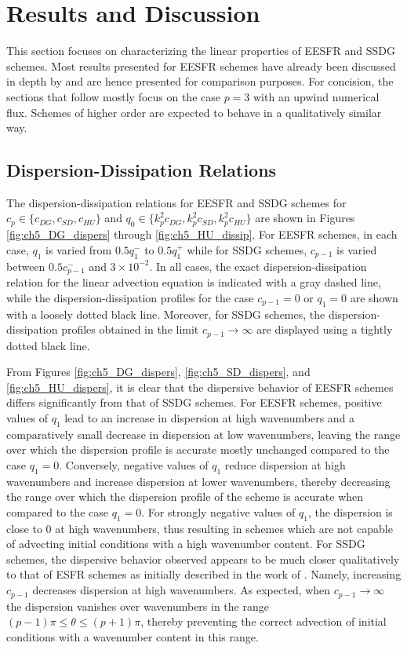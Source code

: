 \documentclass[preprint,12pt]{elsarticle}
\begin{document}
\section{Results and Discussion}
\label{sec:lin_prop}
This section focuses on characterizing the linear properties of EESFR and SSDG schemes. Most results presented for EESFR schemes have already been discussed in depth by \cite{vermeire2016properties} and are hence presented for comparison purposes. For concision, the sections that follow mostly focus on the case $p=3$ with an upwind numerical flux. Schemes of higher order are expected to behave in a qualitatively similar way.

\subsection{Dispersion-Dissipation Relations}
The dispersion-dissipation relations for EESFR and SSDG schemes for $c_p \in \{c_{DG}, c_{SD}, c_{HU}\}$ and $q_0 \in \{k_p^2c_{DG}, k_p^2c_{SD}, k_p^2c_{HU}\}$ are shown in Figures \ref{fig:ch5_DG_dispers} through \ref{fig:ch5_HU_dissip}. For EESFR schemes, in each case, $q_1$ is varied from $0.5 q_1^-$ to $0.5 q_1^+$ while for SSDG schemes, $c_{p-1}$ is varied between $0.5c^{-}_{p-1}$ and $3\times10^{-2}$. In all cases, the exact dispersion-dissipation relation for the linear advection equation is indicated with a gray dashed line, while the dispersion-dissipation profiles for the case $c_{p-1} =0$ or $q_1 =0$ are shown with a loosely dotted black line. Moreover, for SSDG schemes, the dispersion-dissipation profiles obtained in the limit $c_{p-1} \to \infty$ are displayed using a tightly dotted black line.

From Figures \ref{fig:ch5_DG_dispers}, \ref{fig:ch5_SD_dispers}, and \ref{fig:ch5_HU_dispers}, it is clear that the dispersive behavior of EESFR schemes differs significantly from that of SSDG schemes. For EESFR schemes, positive values of $q_1$ lead to an increase in dispersion at high wavenumbers and a comparatively small decrease in dispersion at low wavenumbers, leaving the range over which the dispersion profile is accurate mostly unchanged compared to the case $q_1 = 0$. Conversely, negative values of $q_1$ reduce dispersion at high wavenumbers and increase dispersion at lower wavenumbers, thereby decreasing the range over which the dispersion profile of the scheme is accurate when compared to the case $q_1 = 0$. For strongly negative values of $q_1$, the dispersion is close to 0 at high wavenumbers, thus resulting in schemes which are not capable of advecting initial conditions with a high wavenumber content. For SSDG schemes, the dispersive behavior observed appears to be much closer qualitatively to that of ESFR schemes as initially described in the work of \cite{vincent2011insights}. Namely, increasing $c_{p-1}$ decreases dispersion at high wavenumbers. As expected, when $c_{p-1} \to \infty$ the dispersion vanishes over wavenumbers in the range $(p-1)\pi \leq \theta \leq (p+1)\pi$, thereby preventing the correct advection of initial conditions with a wavenumber content in this range.
\end{document}

